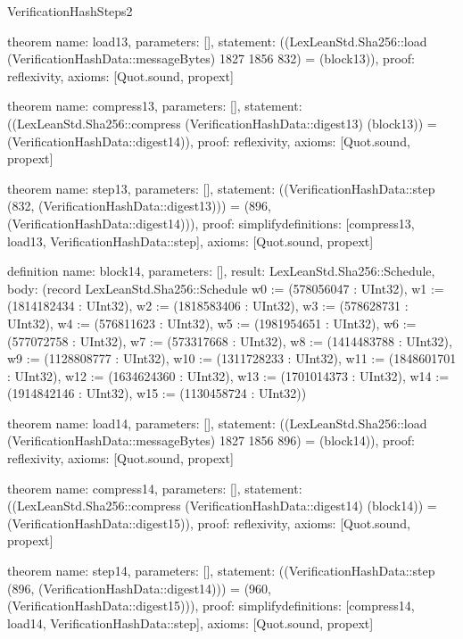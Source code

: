 \begin{lexlean}{VerificationHashSteps2}
\begin{semanticmodule}
theorem{
  name: load13,
  parameters: [],
  statement: ((LexLeanStd.Sha256::load (VerificationHashData::messageBytes) 1827 1856 832) = (block13)),
  proof: reflexivity{},
  axioms: [Quot.sound, propext]
}

theorem{
  name: compress13,
  parameters: [],
  statement: ((LexLeanStd.Sha256::compress (VerificationHashData::digest13) (block13)) = (VerificationHashData::digest14)),
  proof: reflexivity{},
  axioms: [Quot.sound, propext]
}

theorem{
  name: step13,
  parameters: [],
  statement: ((VerificationHashData::step (832, (VerificationHashData::digest13))) = (896, (VerificationHashData::digest14))),
  proof: simplify{definitions: [compress13, load13, VerificationHashData::step]},
  axioms: [Quot.sound, propext]
}

definition{
  name: block14,
  parameters: [],
  result: LexLeanStd.Sha256::Schedule,
  body: (record LexLeanStd.Sha256::Schedule {w0 := (578056047 : UInt32), w1 := (1814182434 : UInt32), w2 := (1818583406 : UInt32), w3 := (578628731 : UInt32), w4 := (576811623 : UInt32), w5 := (1981954651 : UInt32), w6 := (577072758 : UInt32), w7 := (573317668 : UInt32), w8 := (1414483788 : UInt32), w9 := (1128808777 : UInt32), w10 := (1311728233 : UInt32), w11 := (1848601701 : UInt32), w12 := (1634624360 : UInt32), w13 := (1701014373 : UInt32), w14 := (1914842146 : UInt32), w15 := (1130458724 : UInt32)})
}

theorem{
  name: load14,
  parameters: [],
  statement: ((LexLeanStd.Sha256::load (VerificationHashData::messageBytes) 1827 1856 896) = (block14)),
  proof: reflexivity{},
  axioms: [Quot.sound, propext]
}

theorem{
  name: compress14,
  parameters: [],
  statement: ((LexLeanStd.Sha256::compress (VerificationHashData::digest14) (block14)) = (VerificationHashData::digest15)),
  proof: reflexivity{},
  axioms: [Quot.sound, propext]
}

theorem{
  name: step14,
  parameters: [],
  statement: ((VerificationHashData::step (896, (VerificationHashData::digest14))) = (960, (VerificationHashData::digest15))),
  proof: simplify{definitions: [compress14, load14, VerificationHashData::step]},
  axioms: [Quot.sound, propext]
}

\end{semanticmodule}
\end{lexlean}
